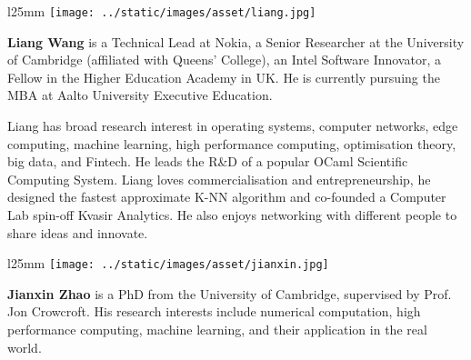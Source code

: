 \begin{wrapfigure}{l}{25mm} 
    \texttt{[image: ../static/images/asset/liang.jpg]}
\end{wrapfigure}\par
\textbf{Liang Wang} is a Technical Lead at Nokia, a Senior Researcher at the University of Cambridge (affiliated with Queens' College), an Intel Software Innovator, a Fellow in the Higher Education Academy in UK. He is currently pursuing the MBA at Aalto University Executive Education. 

Liang has broad research interest in operating systems, computer networks, edge computing, machine learning, high performance computing, optimisation theory, big data, and Fintech. He leads the R\&D of a popular OCaml Scientific Computing System. Liang loves commercialisation and entrepreneurship, he designed the fastest approximate K-NN algorithm and co-founded a Computer Lab spin-off Kvasir Analytics. He also enjoys networking with different people to share ideas and innovate.\par

\vspace{3cm}

\begin{wrapfigure}{l}{25mm} 
    \vspace{-4mm}
    \texttt{[image: ../static/images/asset/jianxin.jpg]}
\end{wrapfigure}\par
\textbf{Jianxin Zhao} is a PhD from the University of Cambridge, supervised by Prof. Jon Crowcroft. His research interests include numerical computation, high performance computing, machine learning, and their application in the real world.\par


\clearpage